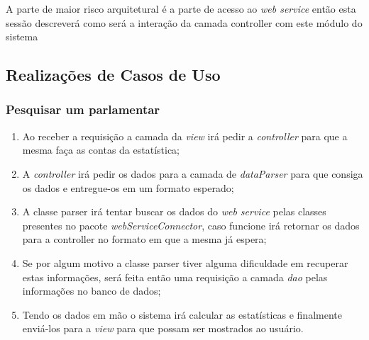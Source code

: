 A parte de maior risco arquitetural é a parte de acesso ao \textit{web service} então esta sessão descreverá como será a interação da camada controller com este módulo do sistema

\subsection{Realizações de Casos de Uso}
	
	\subsubsection{Pesquisar um parlamentar}

		\begin{enumerate}
			\item Ao receber a requisição a camada da \textit{view} irá pedir a \textit{controller} para que a mesma faça as contas da estatística;

			\item A \textit{controller} irá pedir os dados para a camada de \textit{dataParser} para que consiga os dados e entregue-os em um formato esperado;

			\item A classe parser irá tentar buscar os dados do \textit{web service} pelas classes presentes no pacote \textit{webServiceConnector}, caso funcione irá retornar os dados para a controller no formato em que a mesma já espera;

			\item Se por algum motivo a classe parser tiver alguma dificuldade em recuperar estas informações, será feita então uma requisição a camada \textit{dao} pelas informações no banco de dados;

			\item Tendo os dados em mão o sistema irá calcular as estatísticas e finalmente enviá-los para a \textit{view} para que possam ser mostrados ao usuário.
		\end{enumerate}